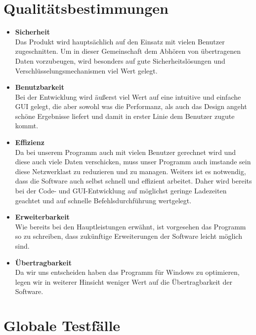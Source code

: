 \documentclass[a4paper,12pt]{scrreprt}
\begin{document}
	
\chapter{Qualitätsbestimmungen}
\begin{itemize}
	\item {\LARGE\textbf{Sicherheit}}\\
	Das Produkt wird hauptsächlich auf den Einsatz mit vielen Benutzer zugeschnitten. Um in dieser Gemeinschaft dem Abhören von übertragenen Daten vorzubeugen, wird besonders auf gute Sicherheitslösungen und Verschlüsselungsmechanismen viel Wert gelegt.
	\item {\LARGE\textbf{Benutzbarkeit}}\\
	Bei der Entwicklung wird äußerst viel Wert auf eine intuitive und einfache GUI gelegt, die aber sowohl was die Performanz, als auch das Design angeht schöne Ergebnisse liefert und damit in erster Linie dem Benutzer zugute kommt.
	\item {\LARGE\textbf{Effizienz}}\\
	Da bei unserem Programm auch mit vielen Benutzer gerechnet wird und diese auch viele Daten verschicken, muss unser Programm auch imstande sein diese Netzwerklast zu reduzieren und zu managen. Weiters ist es notwendig, dass die Software auch selbst schnell und effizient arbeitet. Daher wird bereits bei der Code- und GUI-Entwicklung auf möglichst geringe Ladezeiten geachtet und auf schnelle Befehlsdurchführung wertgelegt.
	\item {\LARGE\textbf{Erweiterbarkeit}}\\
	Wie bereits bei den Hauptleistungen erwähnt, ist vorgesehen das Programm so zu schreiben, dass zukünftige Erweiterungen der Software leicht möglich sind.
	\item {\LARGE\textbf{Übertragbarkeit}}	\\
	Da wir uns entscheiden haben das Programm für Windows zu optimieren, legen wir in weiterer Hinsicht weniger Wert auf die Übertragbarkeit der Software.
	\end{itemize}
\chapter{Globale Testfälle}
\end{document}

